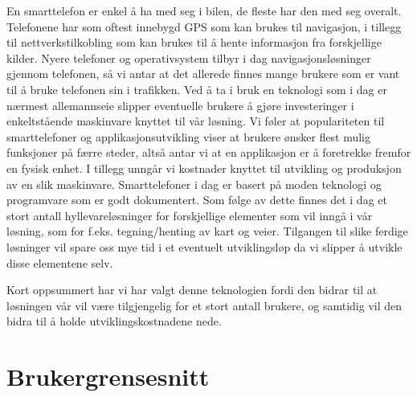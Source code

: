 \documentclass[a4paper,norsk,oneside]{book}
\begin{document}
En smarttelefon er enkel å ha med seg i bilen, de fleste har den med seg overalt. Telefonene har som oftest innebygd GPS som kan brukes til navigasjon, i tillegg til nettverkstilkobling som kan brukes til å hente informasjon fra forskjellige kilder. Nyere telefoner og operativsystem tilbyr i dag navigasjonsløsninger gjennom telefonen, så vi antar at det allerede finnes mange brukere som er vant til å bruke telefonen sin i trafikken. Ved å ta i bruk en teknologi som i dag er nærmest allemannseie slipper eventuelle brukere å gjøre investeringer i enkeltstående maskinvare knyttet til vår løsning. Vi føler at populariteten til smarttelefoner og applikasjonsutvikling viser at brukere ønsker flest mulig funksjoner på færre steder, altså antar vi at en applikasjon er å foretrekke fremfor en fysisk enhet. I tillegg unngår vi kostnader knyttet til utvikling og produksjon av en slik maskinvare. Smarttelefoner i dag er basert på moden teknologi og programvare som er godt dokumentert. Som følge av dette finnes det i dag et stort antall hyllevareløsninger for forskjellige elementer som vil inngå i vår løsning, som for f.eks. tegning/henting av kart og veier. Tilgangen til slike ferdige løsninger vil spare oss mye tid i et eventuelt utviklingsløp da vi slipper å utvikle disse elementene selv.

Kort oppsummert har vi har valgt denne teknologien fordi den bidrar til at løsningen vår vil være tilgjengelig for et stort antall brukere, og samtidig vil den bidra til å holde utviklingskostnadene nede.

%
%

\section{Brukergrensesnitt}
\label{sec:Brukergrensesnitt}
\end{document}
